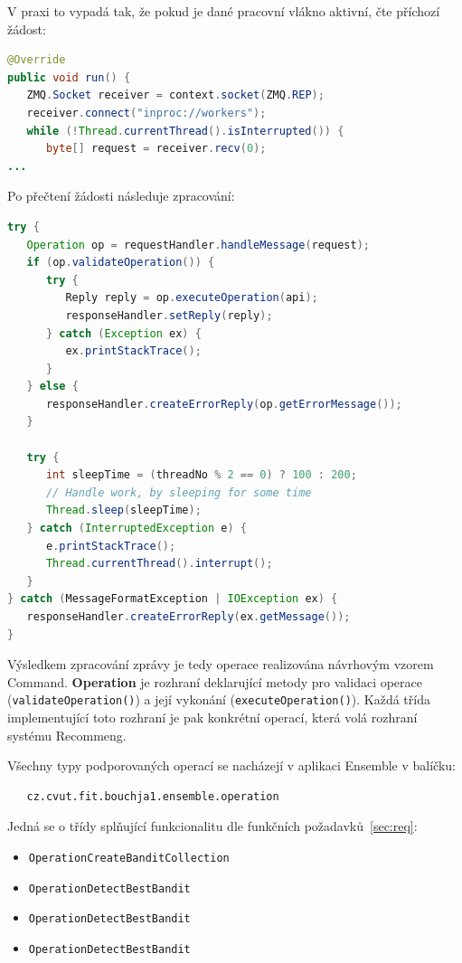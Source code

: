 \documentclass[thesis=M,czech]{FITthesis}[2014/05/07]
\begin{document}
V praxi to vypadá tak, že pokud je dané pracovní vlákno aktivní, čte příchozí žádost:

\begin{lstlisting}[language=java]
@Override
public void run() {
   ZMQ.Socket receiver = context.socket(ZMQ.REP);
   receiver.connect("inproc://workers");
   while (!Thread.currentThread().isInterrupted()) {
      byte[] request = receiver.recv(0);
...
\end{lstlisting}

Po přečtení žádosti následuje zpracování:

\begin{lstlisting}[language=java]
try {
   Operation op = requestHandler.handleMessage(request);
   if (op.validateOperation()) {
      try {
         Reply reply = op.executeOperation(api);
         responseHandler.setReply(reply);
      } catch (Exception ex) {
         ex.printStackTrace();
      }
   } else {
      responseHandler.createErrorReply(op.getErrorMessage());
   }

   try {
      int sleepTime = (threadNo % 2 == 0) ? 100 : 200;
      // Handle work, by sleeping for some time
      Thread.sleep(sleepTime);
   } catch (InterruptedException e) {
      e.printStackTrace();
      Thread.currentThread().interrupt();
   }
} catch (MessageFormatException | IOException ex) {
   responseHandler.createErrorReply(ex.getMessage());
}
\end{lstlisting}

Výsledkem zpracování zprávy je tedy operace realizována návrhovým vzorem Command. \textbf{Operation} je rozhraní deklarující metody pro validaci operace (\texttt{validateOperation()}) a její vykonání (\texttt{executeOperation()}). Každá třída implementující toto rozhraní je pak konkrétní operací, která volá rozhraní systému Recommeng. 

Všechny typy podporovaných operací se nacházejí v aplikaci Ensemble v balíčku:

\begin{verbatim}
   cz.cvut.fit.bouchja1.ensemble.operation
\end{verbatim}

Jedná se o třídy splňující funkcionalitu dle funkčních požadavků~\ref{sec:req}:

\begin{itemize}
	\item \texttt{OperationCreateBanditCollection}
	\item \texttt{OperationDetectBestBandit}
	\item \texttt{OperationDetectBestBandit}
	\item \texttt{OperationDetectBestBandit}			
\end{itemize}
\end{document}
